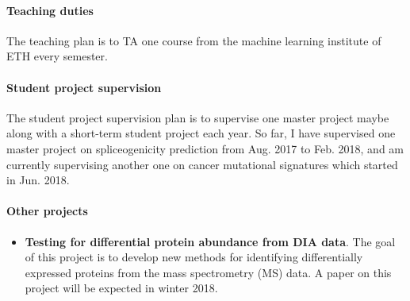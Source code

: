 \paragraph{Teaching duties}
The teaching plan is to TA one course from the machine learning institute of ETH every semester.
\paragraph{Student project supervision}
The student project supervision plan is to supervise one master project maybe along with a short-term student project each year.
So far, I have supervised one master project on spliceogenicity prediction from Aug. 2017 to Feb. 2018, and am currently supervising another one on cancer mutational signatures which started in Jun. 2018.
\paragraph{Other projects}
\begin{itemize}
\item \textbf{Testing for differential protein abundance from DIA data}. The goal of this project is to develop new methods for identifying differentially expressed proteins from the mass spectrometry (MS) data.
A paper on this project will be expected in winter 2018.
\end{itemize}
